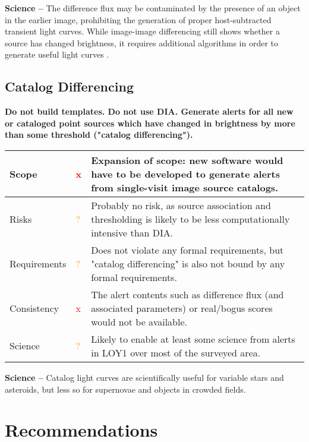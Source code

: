 \documentclass[DM,lsstdraft,toc]{lsstdoc}
\begin{document}
{\bf Science --} The difference flux may be contaminated by the presence of an object in the earlier image, prohibiting the generation of proper host-subtracted transient light curves. While image-image differencing still shows whether a source has changed brightness, it requires additional algorithms in order to generate useful light curves \citep[e.g.,][]{2005AJ....130.2272B}.


\subsection{Catalog Differencing}

{\bf Do not build templates. Do not use DIA. Generate alerts for all new or cataloged point sources which have changed in brightness by more than some threshold ("catalog differencing").}

\begin{center}
\begin{tabular}{|p{2.5cm}|p{0.3cm}|p{13cm}|}
\hline
Scope & \textcolor{red}{x} & Expansion of scope: new software would have to be developed to generate alerts from single-visit image source catalogs. \\
\hline
Risks & \textcolor{orange}{?} & Probably no risk, as source association and thresholding is likely to be less computationally intensive than DIA. \\
\hline
Requirements & \textcolor{orange}{?} & Does not violate any formal requirements, but "catalog differencing" is also not bound by any formal requirements. \\
\hline
Consistency & \textcolor{red}{x} & The alert contents such as difference flux (and associated parameters) or real/bogus scores would not be available. \\
\hline
Science & \textcolor{orange}{?} & Likely to enable at least some science from alerts in LOY1 over most of the surveyed area. \\
\hline
\end{tabular}
\end{center}

{\bf Science --} Catalog light curves are scientifically useful for variable stars and asteroids, but less so for supernovae and objects in crowded fields.



\section{Recommendations}\label{sec:rec}
\end{document}
